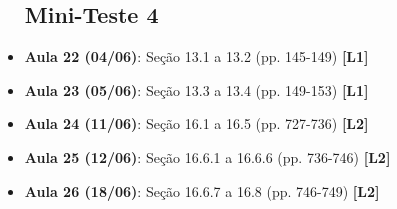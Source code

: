 \documentclass[12pt,a4paper,oneside]{article}
\begin{document}
\begin{itemize}
	\subsection{Mini-Teste 4}
	
	\item[] {\bf Aula 22 (04/06)}: Seção 13.1 a 13.2 (pp. 145-149) {\bf \color{blue} [L1]}
	\item[] {\bf Aula 23 (05/06)}: Seção 13.3 a 13.4 (pp. 149-153) {\bf \color{blue} [L1]}
	\item[] {\bf Aula 24 (11/06)}: Seção 16.1 a 16.5 (pp. 727-736) {\bf \color{purple} [L2]}
	\item[] {\bf Aula 25 (12/06)}: Seção 16.6.1 a 16.6.6 (pp. 736-746) 
	{\bf \color{purple} [L2]}
	\item[] {\bf Aula 26 (18/06)}: Seção 16.6.7 a 16.8 (pp. 746-749) 
	{\bf \color{purple} [L2]}
	
\end{itemize}
\end{document}
